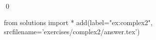 
\begin{ex} 
  \label{ex:complex2}
  
  \qed
\end{ex} 
\begin{python0}
from solutions import *
add(label="ex:complex2",
    srcfilename='exercises/complex2/answer.tex') 
\end{python0}
